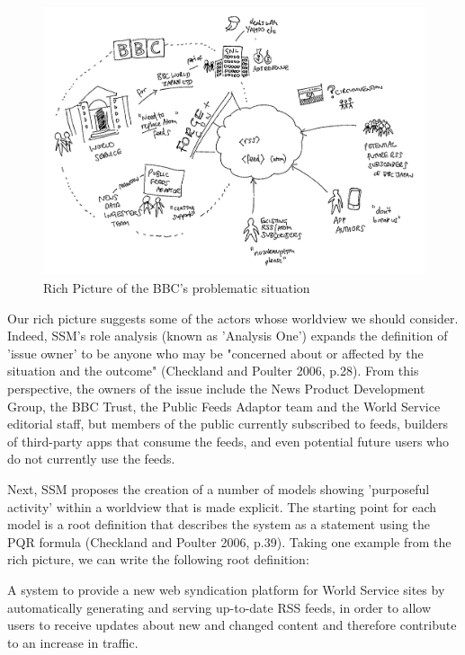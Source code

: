 \documentclass{article}
\begin{document}
\begin{figure}
  \includegraphics[width=\textwidth]{richpicture.png}
  \caption{Rich Picture of the BBC's problematic situation}
  \label{rich-picture}
\end{figure}

Our rich picture suggests some of the actors whose worldview we should consider. Indeed, SSM's role analysis (known as 'Analysis One') expands the definition of 'issue owner' to be anyone who may be "concerned about or affected by the situation and the outcome" (Checkland and Poulter 2006, p.28). From this perspective, the owners of the issue include the News Product Development Group, the BBC Trust, the Public Feeds Adaptor team and the World Service editorial staff, but members of the public currently subscribed to feeds, builders of third-party apps that consume the feeds, and even potential future users who do not currently use the feeds.

Next, SSM proposes the creation of a number of models showing 'purposeful activity' within a worldview that is made explicit. The starting point for each model is a root definition that describes the system as a statement using the PQR formula (Checkland and Poulter 2006, p.39). Taking one example from the rich picture, we can write the following root definition:

\begin{displayquote}
A system to provide a new web syndication platform for World Service sites by automatically generating and serving up-to-date RSS feeds, in order to allow users to receive updates about new and changed content and therefore contribute to an increase in traffic.
\end{displayquote}
\end{document}
